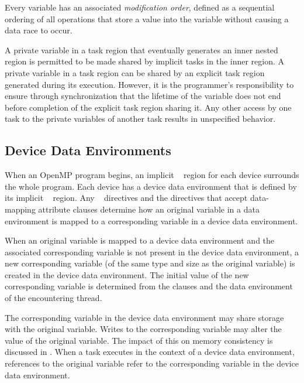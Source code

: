 Every variable has an associated \emph{modification order}, defined as a
sequential ordering of all operations that store a value into the variable
without causing a data race to occur. 

A private variable in a task region that eventually generates an inner nested 
region is permitted to be made shared by implicit tasks in the inner  region.
A private variable in a task region can be shared by an explicit task region generated
during its execution. However, it is the programmer’s responsibility to ensure through
synchronization that the lifetime of the variable does not end before completion of the
explicit task region sharing it. Any other access by one task to the
private variables of another task results in unspecified behavior.




\subsection{Device Data Environments}
\label{subsec:Device Data Environments}
When an OpenMP program begins, an implicit ~ region for each device surrounds the whole program. Each device has a device data environment that is defined by its implicit ~ region. Any ~ directives and the directives that accept data-mapping attribute clauses determine how an original variable in a data environment is mapped to a corresponding variable in a device data environment.

When an original variable is mapped to a device data environment and the associated corresponding variable is not present in the device data environment, a new corresponding variable (of the same type and size as the original variable) is created in the device data environment. The initial value of the new corresponding variable is determined from the clauses and the data environment of the encountering thread.

The corresponding variable in the device data environment may share storage with the
original variable. Writes to the corresponding variable may alter the value of the original
variable. The impact of this on memory consistency is discussed in 
. 
When a task executes in the context of a device data environment, references to  
the original variable refer to the corresponding variable in the device data environment.

